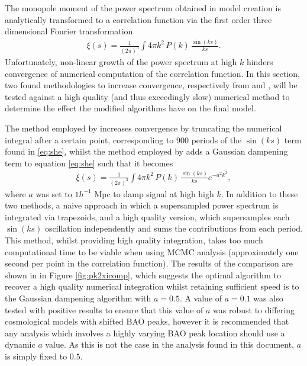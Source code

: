 \documentclass[titlesmallcaps, examinerscopy, copyrightpage]{uqthesis}
\begin{document}
\begin{appendices}
The monopole moment of the power spectrum obtained in model creation is analytically transformed to a correlation function via the first order three dimensional Fourier transformation 
\begin{align} \label{eq:she}
\xi(s) = \frac{1}{(2 \pi)^3} \int 4 \pi k^2 \, P(k)\,  \frac{\sin(ks)}{ks}.
\end{align}
Unfortunately, non-linear growth of the power spectrum at high $k$ hinders convergence of numerical computation of the correlation function. In this section, two found methodologies to increase convergence, respectively from \citet{BlakeDavis2011} and \citet{AndersonAubourg2012}, will be tested against a high quality (and thus exceedingly slow) numerical method to determine the effect the modified algorithms have on the final model.

The method employed by \citet{BlakeDavis2011} increases convergence by truncating the numerical integral after a certain point, corresponding to 900 periods of the $\sin(ks)$ term found in \eqref{eq:she}, whilst the method employed by \citet{AndersonAubourg2012} adds a Gaussian dampening term to equation \eqref{eq:she} such that it becomes
\begin{align}
\xi(s) = \frac{1}{(2 \pi)^3} \int 4 \pi k^2 \, P(k)\,  \frac{\sin(ks)}{ks} e^{-a^2 k^2},
\end{align}
where $a$ was set to $1 h^{-1}$ Mpc to damp signal at high high $k$. In addition to these two methods, a naive approach in which a supersampled power spectrum is integrated via trapezoids, and a high quality version, which supersamples each $\sin(ks)$ oscillation independently and sums the contributions from each period. This method, whilst providing high quality integration, takes too much computational time to be viable when using MCMC analysis (approximately one second per point in the correlation function). The results of the comparison are shown in in Figure \ref{fig:pk2xicomp}, which suggests the optimal algorithm to recover a high quality numerical integration whilst retaining sufficient speed is to the Gaussian dampening algorithm with $a=0.5$. A value of $a=0.1$ was also tested with positive results to ensure that this value of $a$ was robust to differing cosmological models with shifted BAO peaks, however it is recommended that any analysis which involves a highly varying BAO peak location should use a dynamic $a$ value. As this is not the case in the analysis found in this document, $a$ is simply fixed to $0.5$.


\end{appendices}
\end{document}
